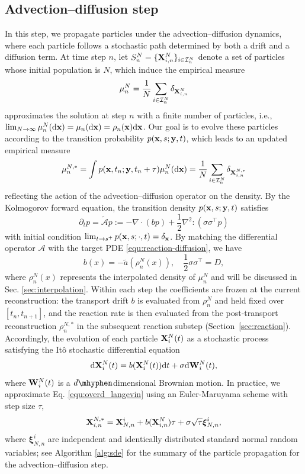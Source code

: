 \documentclass[a4paper,fleqn]{cas-sc}
\theoremstyle{definition}
\theoremstyle{remark}
\begin{document}
\subsection{Advection--diffusion step}
\label{sec:advection_diffusion}
In this step, we propagate particles under the advection–diffusion dynamics, where each particle follows a stochastic path determined by both a drift and a diffusion term. At time step $n$, let $S^N_n = \{\mathbf{X}^N_{i,n}\}_{i\in \mathcal I_n^N}$ denote  a set of particles  whose initial population is $N$, which induce the empirical measure 
\[
\mu^N_{n}= \frac{1}{N}\sum_{i\in \mathcal I_n^N}\delta_{\mathbf{X}^N_{i,n}}
\] 
approximates the solution at step $n$ with a finite number of particles, i.e.,  $\lim_{N\to\infty} \mu^N_{n} (\mathrm{d} \mathbf{x}) = \mu_n(\mathrm{d} \mathbf{x}) = \rho_n(\mathbf{x})\mathrm{d} \mathbf{x}$. 
Our goal is to evolve these particles according to the transition probability $p(\mathbf{x},s;\mathbf{y},t)$, which leads to an updated empirical measure
\[\mu_n^{N,*} = \int p(\mathbf{x},t_n;\mathbf{y},t_n+\tau)  \mu_n^N(\mathrm{d} \mathbf{x}) =   \frac{1}{N}\sum_{i\in \mathcal I_n^N}\delta_{\mathbf{X}_{i,n}^{N,*}}
\]  
reflecting the action of the advection--diffusion operator on the density.
By the Kolmogorov forward equation, the transition density $p(\mathbf{x},s;\mathbf{y},t)$ satisfies 
\begin{equation}
    \partial_t p = \tilde {\mathcal A }p := - \nabla \cdot(b  p) + \frac{1}{2}\nabla^2:(\sigma \sigma^\top p) 
\end{equation}
with initial condition $\lim_{t\to s^+} p(\mathbf{x},s;\cdot,t) = \delta_{\mathbf{x}}$. By matching the differential operator $\mathcal A$ with the target PDE \eqref{equ:reaction-diffusion}, we have 
\begin{equation}
    b(x) = -\tilde a(\rho^N_n(x)), \quad \frac{1}{2}\sigma \sigma^\top = D,
\end{equation}
where $\rho^N_n(x)$ represents the interpolated density of $\mu_n^N$ and will be discussed in Sec. \ref{sec:interpolation}.
Within each step the coefficients are frozen at the current reconstruction: the transport drift $b$ is evaluated
from $\rho^N_n$ and held fixed over $[t_n,t_{n+1}]$, and the reaction rate is then evaluated from the
post-transport reconstruction $\rho^{N,\ast}_n$ in the subsequent reaction substep (Section~\ref{sec:reaction}).
%
Accordingly, the evolution of each particle $\mathbf{X}_{i}^{N}(t)$ as a stochastic process satisfying the It\^o stochastic differential equation
\begin{equation}\label{equ:overd_langevin}
    \mathrm{d} \mathbf{X}^N_{i}(t) = b(\mathbf{X}^N_{i} (t)) \mathrm{d} t  + \sigma \mathrm{d} \mathbf{W}^N_{i}(t),
\end{equation}
where $\mathbf{W}^N_i(t)$ is a $d\mhyphen$dimensional Brownian motion.
In practice, we approximate Eq. \eqref{equ:overd_langevin} using an Euler-Maruyama scheme with step size $\tau$, 
\begin{equation}
 \mathbf{X}_{i,n}^{N,*} = \mathbf{X}_{N,n}^{i} + b(\mathbf{X}^N_{i,n}) \tau  + \sigma \sqrt{\tau} \boldsymbol{\xi}^i_{N,n},
 \label{eq:euler_maruyama}
\end{equation}
where $\boldsymbol{\xi}^i_{N,n}$ are independent and identically distributed standard normal random variables; see Algorithm \ref{alg:sde} for the summary of the particle propagation for the advection--diffusion step. 
\end{document}
